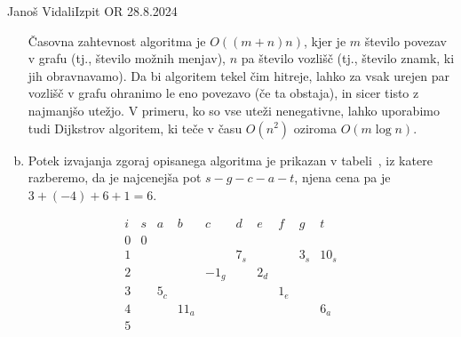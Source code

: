 \begin{naloga}{Janoš Vidali}{Izpit OR 28.8.2024}
\begin{odgovor}
\begin{enumerate}[(a)]
Časovna zahtevnost algoritma je $O((m + n) n)$,
kjer je $m$ število povezav v grafu (tj., število možnih menjav),
$n$ pa število vozlišč (tj., število znamk, ki jih obravnavamo).
Da bi algoritem tekel čim hitreje,
lahko za vsak urejen par vozlišč v grafu ohranimo le eno povezavo
(če ta obstaja),
in sicer tisto z najmanjšo utežjo.
V primeru, ko so vse uteži nenegativne,
lahko uporabimo tudi Dijkstrov algoritem,
ki teče v času $O(n^2)$ oziroma $O(m \log n)$.

\item Potek izvajanja zgoraj opisanega algoritma je prikazan v tabeli~\tab,
iz katere razberemo,
da je najcenejša pot $s - g - c - a - t$,
njena cena pa je $3 + (-4) + 6 + 1 = 6$.
\end{enumerate}
%
\begin{tabela}
$$
\begin{array}{c|ccccccccc}
i & s & a & b & c & d & e & f & g & t \\ \hline
0 & 0 &&&&&&&& \\
1 &&&&& 7_s &&& 3_s & 10_s \\
2 &&&& -1_g && 2_d &&& \\
3 && 5_c &&&&& 1_e && \\
4 &&& 11_a &&&&&& 6_a \\
5 &&&&&&&&&
\end{array}
$$
\end{tabela}
\end{odgovor}
\end{naloga}

